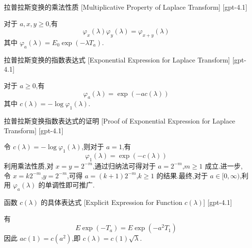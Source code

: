 \documentclass[UTF8]{ctexart}
\begin{document}
    
    
    \begin{thm}
        {拉普拉斯变换的乘法性质}
        [Multiplicative Property of Laplace Transform]
        [gpt-4.1]
        
对于 $a, x, y \geq 0$,有
\[
\varphi_{x}(\lambda)\varphi_{y}(\lambda) = \varphi_{x+y}(\lambda)
\]
其中 $\varphi_{a}(\lambda) = E_{0} \exp(-\lambda T_{a})$.

    \end{thm}
    
    
    
    \begin{thm}
        {拉普拉斯变换的指数表达式}
        [Exponential Expression for Laplace Transform]
        [gpt-4.1]
        
对于 $a \geq 0$,有
\[
\varphi_{a}(\lambda) = \exp(-a c(\lambda))
\]
其中 $c(\lambda) = -\log \varphi_{1}(\lambda)$.

    \end{thm}
    
    
    
    \begin{prf}
        {拉普拉斯变换指数表达式的证明}
        [Proof of Exponential Expression for Laplace Transform]
        [gpt-4.1]
        
令 $c(\lambda) = -\log \varphi_{1}(\lambda)$,则对于 $a = 1$,有
\[
\varphi_{1}(\lambda) = \exp(-c(\lambda))
\]
利用乘法性质,对 $x = y = 2^{-m}$,通过归纳法可得对于 $a = 2^{-m}$,$m \geq 1$ 成立.进一步,令 $x = k 2^{-m}$,$y = 2^{-m}$,可得 $a = (k+1)2^{-m}$,$k \geq 1$ 的结果.最终,对于 $a \in [0, \infty)$,利用 $\varphi_{a}(\lambda)$ 的单调性即可推广.

    \end{prf}
    
    
    
    \begin{thm}
        {函数 $c(\lambda)$ 的具体表达式}
        [Explicit Expression for Function $c(\lambda)$]
        [gpt-4.1]
        
有
\[
E \exp(-T_{a}) = E \exp(-a^{2} T_{1})
\]
因此 $a c(1) = c(a^{2})$,即 $c(\lambda) = c(1)\sqrt{\lambda}$.

    \end{thm}
    
    
    
\end{document}
